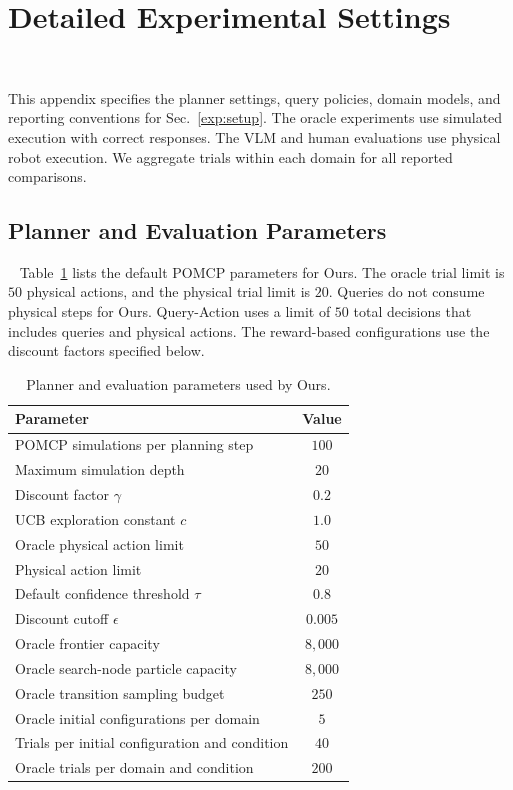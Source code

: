 \section{Detailed Experimental Settings}~\label{appx:settings}

This appendix specifies the planner settings, query policies, domain models, and reporting conventions for Sec.~\ref{exp:setup}. The oracle experiments use simulated execution with correct responses. The VLM and human evaluations use physical robot execution. We aggregate trials within each domain for all reported comparisons.

\subsection{Planner and Evaluation Parameters}~\label{appx:planner_params}
Table~\ref{tab:app_planner_params} lists the default POMCP parameters for Ours. The oracle trial limit is $50$ physical actions, and the physical trial limit is $20$. Queries do not consume physical steps for Ours. Query-Action uses a limit of $50$ total decisions that includes queries and physical actions. The reward-based configurations use the discount factors specified below. 

\begin{table}[!htbp]
\centering
\caption{Planner and evaluation parameters used by Ours.}
\label{tab:app_planner_params}
\small
\begin{tabular}{lc}
\toprule
\textbf{Parameter} & \textbf{Value} \\
\midrule
POMCP simulations per planning step & $100$ \\
Maximum simulation depth & $20$ \\
Discount factor $\gamma$ & $0.2$ \\
UCB exploration constant $c$ & $1.0$ \\
Oracle physical action limit & $50$ \\
Physical action limit & $20$ \\
Default confidence threshold $\tau$ & $0.8$ \\
Discount cutoff $\epsilon$ & $0.005$ \\
Oracle frontier capacity & $8{,}000$ \\
Oracle search-node particle capacity & $8{,}000$ \\
Oracle transition sampling budget & $250$ \\
Oracle initial configurations per domain & $5$ \\
Trials per initial configuration and condition & $40$ \\
Oracle trials per domain and condition & $200$ \\
\bottomrule
\end{tabular}
\end{table}


